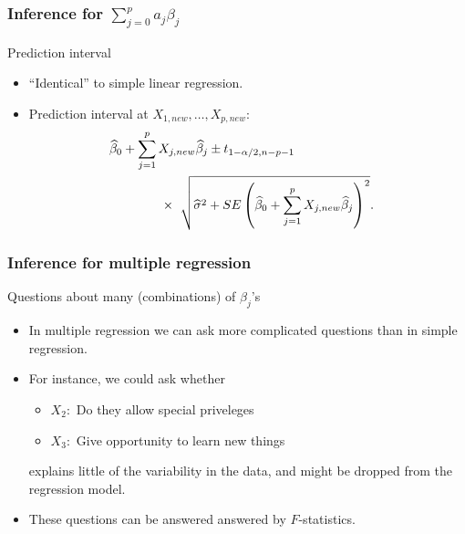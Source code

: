 \documentclass[handout]{beamer}
\begin{document}
   \begin{frame} \frametitle{Inference for $\sum_{j=0}^p a_j \beta_j$}

   \begin{block}
   {Prediction interval}
   \begin{itemize}

   \item ``Identical'' to simple linear regression.

   \item Prediction interval at $X_{1,new}, \dots, X_{p,new}$:
   $$
   \begin{aligned}
   \lefteqn{\widehat{\beta}_0 + \sum_{j=1}^p X_{j,new} \widehat{\beta}_j\pm t_{1-\alpha/2, n-p-1}} \\
   & \qquad \qquad  \times \ \sqrt{\widehat{\sigma}^2 + SE\left(\widehat{\beta}_0 + \sum_{j=1}^p X_{j,new}\widehat{\beta}_j\right)^2}.
   \end{aligned}
   $$

   \end{itemize}
   \end{block}
   \end{frame}


   \begin{frame} \frametitle{Inference for multiple regression}

   \begin{block}
   {Questions about many (combinations) of $\beta_j$'s}
   \begin{itemize}

   \item In multiple regression we can ask more complicated questions
   than in simple regression.


   \item For instance, we could ask whether
   \begin{itemize}

   \item $X_2:$ Do they allow  special priveleges

   \item $X_3:$ Give opportunity to learn new things
   \end{itemize}
   explains little of the variability in the data, and might be dropped
   from the regression model.
   \item These questions can be answered answered by $F$-statistics.
   \end{itemize}
   \end{block}
   \end{frame}
\end{document}
